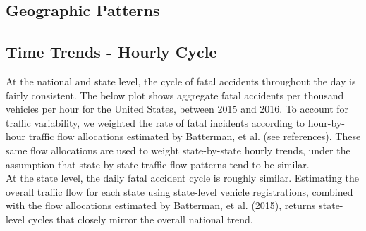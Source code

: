 \documentclass[11pt, oneside,titlepage]{article}   	%
\begin{document}
\subsection*{Geographic Patterns}

\subsection*{Time Trends - Hourly Cycle}
At the national and state level, the cycle of fatal accidents throughout the day is fairly consistent. The below plot shows aggregate fatal accidents per thousand vehicles per hour for the United States, between 2015 and 2016. To account for traffic variability, we weighted the rate of fatal incidents according to hour-by-hour traffic flow allocations estimated by Batterman, et al. (see references). These same flow allocations are used to weight state-by-state hourly trends, under the assumption that state-by-state traffic flow patterns tend to be similar. \\

At the state level, the daily fatal accident cycle is roughly similar. Estimating the overall traffic flow for each state using state-level vehicle registrations, combined with the flow allocations estimated by Batterman, et al. (2015), returns state-level cycles that closely mirror the overall national trend.
\end{document}
